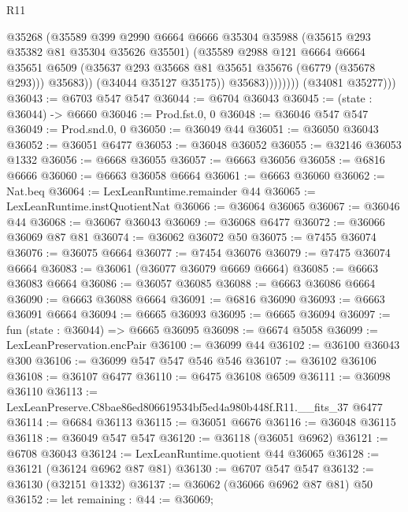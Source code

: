 \begin{lexlean}{R11}
\begin{coremodule}
                          @35268
                          (@35589
                            @399
                            @2990
                            @6664
                            @6666
                            @35304
                            @35988
                            (@35615 @293 @35382 @81 @35304 @35626 @35501)
                            (@35589
                              @2988
                              @121
                              @6664
                              @6664
                              @35651
                              @6509
                              (@35637 @293 @35668 @81 @35651 @35676 (@6779 (@35678 @293)))
                              @35683))
                          (@34044 @35127 @35175))
                        @35683))))))))
        (@34081 @35277)))
@36043 := @6703 @547 @547
@36044 := @6704 @36043
@36045 := (state : @36044) -> @6660
@36046 := Prod.fst.{0, 0}
@36048 := @36046 @547 @547
@36049 := Prod.snd.{0, 0}
@36050 := @36049 @44
@36051 := @36050 @36043
@36052 := @36051 @6477
@36053 := @36048 @36052
@36055 := @32146 @36053 @1332
@36056 := @6668 @36055
@36057 := @6663 @36056
@36058 := @6816 @6666
@36060 := @6663 @36058 @6664
@36061 := @6663 @36060
@36062 := Nat.beq
@36064 := LexLeanRuntime.remainder @44
@36065 := LexLeanRuntime.instQuotientNat
@36066 := @36064 @36065
@36067 := @36046 @44
@36068 := @36067 @36043
@36069 := @36068 @6477
@36072 := @36066 @36069 @87 @81
@36074 := @36062 @36072 @50
@36075 := @7455 @36074
@36076 := @36075 @6664
@36077 := @7454 @36076
@36079 := @7475 @36074 @6664
@36083 := @36061 (@36077 @36079 @6669 @6664)
@36085 := @6663 @36083 @6664
@36086 := @36057 @36085
@36088 := @6663 @36086 @6664
@36090 := @6663 @36088 @6664
@36091 := @6816 @36090
@36093 := @6663 @36091 @6664
@36094 := @6665 @36093
@36095 := @6665 @36094
@36097 := fun (state : @36044) => @6665 @36095
@36098 := @6674 @5058
@36099 := LexLeanPreservation.encPair
@36100 := @36099 @44
@36102 := @36100 @36043 @300
@36106 := @36099 @547 @547 @546 @546
@36107 := @36102 @36106
@36108 := @36107 @6477
@36110 := @6475 @36108 @6509
@36111 := @36098 @36110
@36113 := LexLeanPreserve.C8bae86ed806619534bf5ed4a980b448f.R11.__fits_37 @6477
@36114 := @6684 @36113
@36115 := @36051 @6676
@36116 := @36048 @36115
@36118 := @36049 @547 @547
@36120 := @36118 (@36051 @6962)
@36121 := @6708 @36043
@36124 := LexLeanRuntime.quotient @44 @36065
@36128 := @36121 (@36124 @6962 @87 @81)
@36130 := @6707 @547 @547
@36132 := @36130 (@32151 @1332)
@36137 := @36062 (@36066 @6962 @87 @81) @50
@36152 := let remaining : @44 := @36069;

\end{coremodule}
\end{lexlean}
